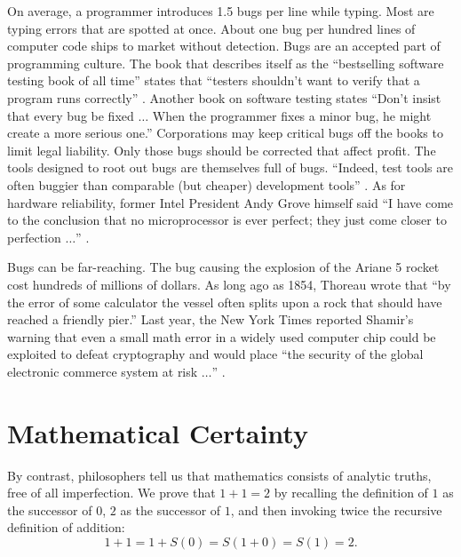 \documentclass{llncs}
\begin{document}
  On average,
a programmer introduces 1.5 bugs per line while typing.
Most are typing errors that are spotted at once.
About one bug per hundred lines of computer code ships  to
market without detection.  Bugs are an accepted
part of programming culture.
The book that describes itself as the ``bestselling software testing
book of all time'' states that ``testers shouldn't want to verify
that a program runs correctly'' \cite{KFN}.
Another book on software
testing states ``Don't insist that every bug be fixed $\ldots$
When the programmer fixes a minor bug, he might create
a more serious one.''  Corporations may keep critical bugs
off the books to
limit legal liability.
 Only those bugs should be corrected
that affect  profit.
The tools designed to root out bugs are themselves
full of bugs. ``Indeed, test tools are often buggier than
comparable (but cheaper) development tools''
\cite{KBP}.
As for hardware reliability, former 
Intel President Andy Grove himself said 
``I have come to the conclusion that no microprocessor is ever
perfect; they just come closer to perfection $\ldots$''
\cite[p.221]{Mac}.


Bugs can be far-reaching.
The bug causing the 
explosion of the Ariane 5 rocket cost hundreds of millions
of dollars.  As long ago as 1854, Thoreau wrote that 
``by the error of some calculator
the vessel often splits upon a rock that should have reached
a friendly pier.''  %
Last year, the New York Times reported Shamir's warning that
even a small math error in a widely used computer chip could 
be exploited to defeat cryptography and would
place
``the security of the global electronic commerce system at risk
$\ldots$'' \cite{NYT}.





\section{Mathematical Certainty}

By contrast, philosophers tell us that
mathematics consists of analytic truths,
free of all imperfection.  We prove that $1+1=2$ by
recalling the definition of $1$ as the successor of $0$,
$2$ as the successor of $1$, and then invoking twice the recursive
definition
of addition: 
  $$1+1 = 1 + S(0) = S(1 + 0) = S(1) = 2.$$
\end{document}

